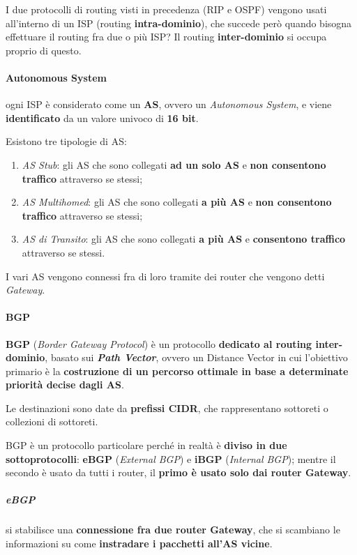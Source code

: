 \documentclass[a4paper]{article}
\begin{document}
			I due protocolli di routing visti in precedenza (RIP e OSPF) vengono usati all'interno di un ISP (routing \textbf{intra-dominio}), che succede però quando bisogna effettuare il routing fra due o più ISP? Il routing \textbf{inter-dominio} si occupa proprio di questo.
			
			\paragraph{Autonomous System}
				ogni ISP è considerato come un \textbf{AS}, ovvero un \emph{Autonomous System}, e viene \textbf{identificato} da un valore univoco di \textbf{16 bit}.
				
				Esistono tre tipologie di AS:
				\begin{enumerate}
					\item \emph{AS Stub}: gli AS che sono collegati \textbf{ad un solo AS} e \textbf{non consentono traffico} attraverso se stessi;
					\item \emph{AS Multihomed}: gli AS che sono collegati \textbf{a più AS} e \textbf{non consentono traffico} attraverso se stessi;
					\item \emph{AS di Transito}: gli AS che sono collegati \textbf{a più AS} e \textbf{consentono traffico} attraverso se stessi.
				\end{enumerate}
				
				I vari AS vengono connessi fra di loro tramite dei router che vengono detti \emph{Gateway}.
				
			\paragraph{BGP}
				\textbf{BGP} (\emph{Border Gateway Protocol}) è un protocollo \textbf{dedicato al routing inter-dominio}, basato sui \textbf{\emph{Path Vector}}, ovvero un Distance Vector in cui l'obiettivo primario è la \textbf{costruzione di un percorso ottimale in base a determinate priorità decise dagli AS}.
				
				Le destinazioni sono date da \textbf{prefissi CIDR}, che rappresentano sottoreti o collezioni di sottoreti.
				
				BGP è un protocollo particolare perché in realtà è \textbf{diviso in due sottoprotocolli}: \textbf{eBGP} (\emph{External BGP}) e \textbf{iBGP} (\emph{Internal BGP}); mentre il secondo è usato da tutti i router, il \textbf{primo è usato solo dai router Gateway}. 
				
				\subparagraph{eBGP}
					si stabilisce una \textbf{connessione fra due router Gateway}, che si scambiano le informazioni su come \textbf{instradare i pacchetti all'AS vicine}.
					
\end{document}
